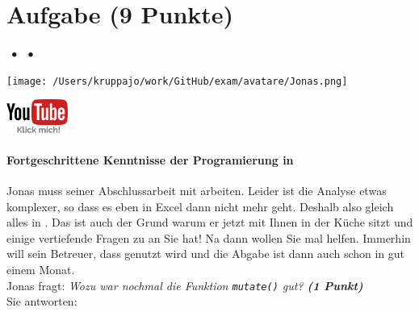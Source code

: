 \documentclass[a4paper, 9pt]{scrartcl}\usepackage[]{graphicx}\usepackage[]{xcolor}
\begin{document}
\section{Aufgabe \hfill (9 Punkte)}



 
\ifcollection
\begin{flushright}
\tiny\vspace{-3Ex}
\textbf{\examinhaltstart}
\exammodulelanddaten $\;\bullet$
\exammodulestatversuch $\;\bullet$
\exammodulebiostat
\vspace{-4Ex}
\end{flushright}
\begin{minipage}[t]{0.5\textwidth}
\texttt{[image: /Users/kruppajo/work/GitHub/exam/avatare/Jonas.png]}
\end{minipage}
\begin{minipage}[t]{0.5\textwidth}
\hfill
\href{https://www.youtube.com/playlist?list=PLe51bCp9JvEFUnFqaJG5aRmON9i1ZbOYC}{\includegraphics[width = 2cm]{img/youtube}}
\end{minipage}
\vspace{1ex}
\fi



\ifcollection
\paragraph{Fortgeschrittene Kenntnisse der Programierung in \Rlogo}
\fi

Jonas muss seiner Abschlussarbeit mit \Rlogo arbeiten. Leider ist die Analyse etwas komplexer, so dass es eben in Excel dann nicht mehr geht. Deshalb also gleich alles in \Rlogo. Das ist auch der Grund warum er jetzt mit Ihnen in der Küche sitzt und einige vertiefende Fragen zu \Rlogo an Sie hat! Na dann wollen Sie mal helfen. Immerhin will sein Betreuer, dass \Rlogo genutzt wird und die Abgabe ist dann auch schon in gut einem Monat.\\[1Ex]

Jonas fragt: \textit{Wozu war nochmal die Funktion \texttt{mutate()} gut?  \textbf{(1 Punkt)}}\\[1ex]
Sie antworten:\\[6.5Ex]
\end{document}
